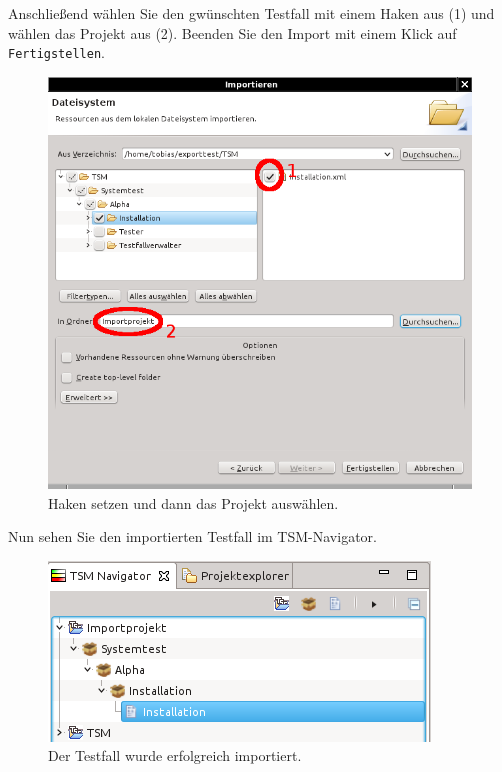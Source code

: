 \documentclass[11pt,a4paper,titlepage]{article}
\begin{document}
\vspace{\baselineskip}
Anschließend wählen Sie den gwünschten Testfall mit einem Haken aus (1) und wählen das Projekt aus (2). Beenden Sie den Import mit einem Klick auf \texttt{Fertigstellen}.
\begin{figure}[H]
 \centering
 \includegraphics{./ImportierenExportieren/assistent-imp2.png}
 \caption{Haken setzen und dann das Projekt auswählen.}
 \label{abb:Assistent-imp2}
\end{figure}
\vspace{\baselineskip}
Nun sehen Sie den importierten Testfall im TSM-Navigator.
\begin{figure}[H]
 \centering
 \includegraphics{./ImportierenExportieren/importierter-testfall.png}
 \caption{Der Testfall wurde erfolgreich importiert.}
 \label{abb:Importierter-testfall}
\end{figure}
\end{document}
